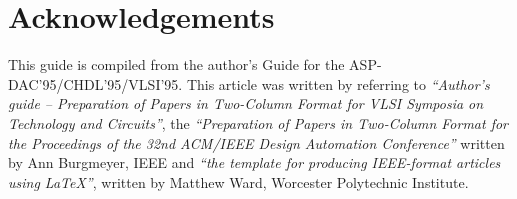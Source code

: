 \documentclass[twocolumn,a4paper]{article}
\begin{document}
\section*{\sc Acknowledgements}
This guide is compiled from the author's Guide for the
ASP-DAC'95/CHDL'95/VLSI'95.
This article was written by referring to {\em ``Author's guide --
Preparation of Papers in Two-Column Format for VLSI Symposia on
Technology and Circuits''}, the {\em ``Preparation of Papers in
Two-Column Format for the Proceedings of the 32nd ACM/IEEE Design
Automation Conference''} written by Ann Burgmeyer, IEEE and {\em ``the
template for producing IEEE-format articles using LaTeX''}, written by
Matthew Ward, Worcester Polytechnic Institute.

\footnotesize



\end{document}
